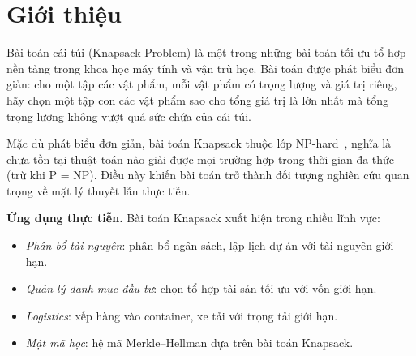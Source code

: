 \documentclass[fontsize=13pt,a4paper]{report}
\begin{document}
\printnomenclature

\tableofcontents
\vfil\null\endtitlepage


\fancyhead{}  %
\renewcommand{\footrulewidth}{0.4pt}

\pagestyle{fancy}  %
%


\section{Giới thiệu}
\label{sec:intro}

Bài toán cái túi (Knapsack Problem) là một trong những bài toán tối ưu tổ hợp nền tảng trong khoa học máy tính và vận trù học. Bài toán được phát biểu đơn giản: cho một tập các vật phẩm, mỗi vật phẩm có trọng lượng và giá trị riêng, hãy chọn một tập con các vật phẩm sao cho tổng giá trị là lớn nhất mà tổng trọng lượng không vượt quá sức chứa của cái túi.

Mặc dù phát biểu đơn giản, bài toán Knapsack thuộc lớp NP-hard~\cite{karp1972reducibility}, nghĩa là chưa tồn tại thuật toán nào giải được mọi trường hợp trong thời gian đa thức (trừ khi P = NP). Điều này khiến bài toán trở thành đối tượng nghiên cứu quan trọng về mặt lý thuyết lẫn thực tiễn.

\textbf{Ứng dụng thực tiễn.} Bài toán Knapsack xuất hiện trong nhiều lĩnh vực:
\begin{itemize}[noitemsep]
    \item \textit{Phân bổ tài nguyên}: phân bổ ngân sách, lập lịch dự án với tài nguyên giới hạn.
    \item \textit{Quản lý danh mục đầu tư}: chọn tổ hợp tài sản tối ưu với vốn giới hạn.
    \item \textit{Logistics}: xếp hàng vào container, xe tải với trọng tải giới hạn.
    \item \textit{Mật mã học}: hệ mã Merkle--Hellman dựa trên bài toán Knapsack.
\end{itemize}
\end{document}
